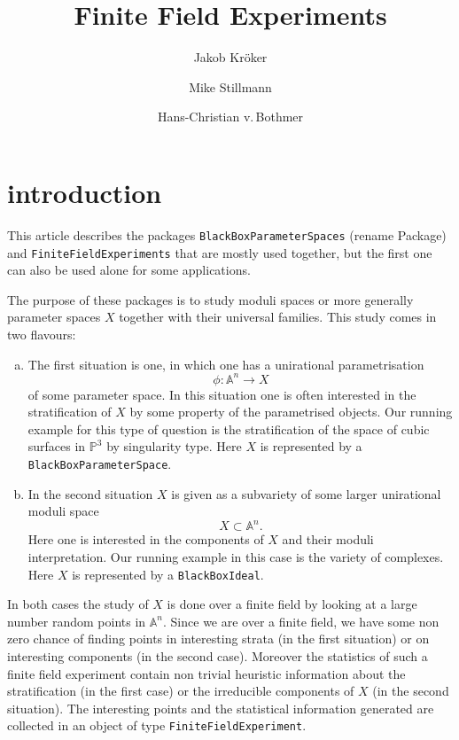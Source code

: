 \documentclass[12pt,a4paper]{amsart}
\theoremstyle{plain}
\theoremstyle{definition}
\renewcommand{\AA}{\mathbb A}
\newcommand{\PP}{\mathbb P}
\begin{document}
\title{Finite Field Experiments}

\author{Jakob Kr\"oker}
\author{Mike Stillmann}
\author{Hans-Christian v.\,Bothmer}

\maketitle

\section{introduction}

This article describes the packages {\tt BlackBoxParameterSpaces} {\color{red} (rename Package)} and
 {\tt FiniteFieldExperiments} that are mostly used together, but the first one can also be used alone for some applications.

The purpose of these packages is to study moduli spaces or more generally parameter spaces $X$ together with their universal families. This study comes in two flavours:

\begin{enumerate}[(a)]
\item The first situation is one, in which one has a unirational parametrisation 
\[
	\phi \colon \AA^n \to X
\]
of some parameter space. In this situation one is often interested in the stratification of $X$ by some property of the parametrised objects. Our running example for this type of question is the stratification of the space of cubic surfaces in $\PP^3$ by singularity type. Here $X$ is represented by a {\tt BlackBoxParameterSpace}.

\item In the second situation $X$ is given as a subvariety of some larger unirational moduli space
\[
	X \subset \AA^n.
\]
Here one is interested in the components of $X$ and their moduli interpretation. Our running example in this case is the variety of complexes. Here $X$ is represented by a {\tt BlackBoxIdeal}.
\end{enumerate}

In both cases the study of $X$ is done over a finite field by looking at a large number random points in $\AA^n$. Since we are over a finite field, we have some non zero chance of finding points in interesting strata (in the first situation) or on interesting components (in the second case). Moreover the statistics of such a finite field experiment contain non trivial heuristic information about the stratification (in the first case) or the irreducible components of $X$ (in the second situation). The interesting points and the statistical information generated are collected in an object of type {\tt FiniteFieldExperiment}.
\end{document}
